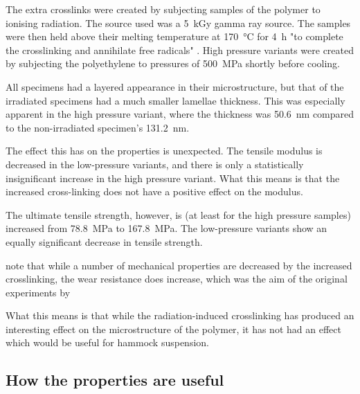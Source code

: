 The extra crosslinks were created by subjecting samples of the polymer to ionising radiation. The source used was a \SI{5}{\kilo\gray} gamma ray source. The samples were then held above their melting temperature at \SI{170}{\celsius} for \SI{4}{\hour} "to complete the crosslinking and annihilate free radicals" . High pressure variants were created by subjecting the polyethylene to pressures of \SI{500}{\mega\pascal} shortly before cooling.

All specimens had a layered appearance in their microstructure, but that of the irradiated specimens had a much smaller lamellae thickness. This was especially apparent in the high pressure variant, where the thickness was \SI{50.6}{\nano\metre} compared to the non-irradiated specimen's \SI{131.2}{\nano\metre}.

The effect this has on the properties is unexpected. The tensile modulus is decreased in the low-pressure variants, and there is only a statistically insignificant increase in the high pressure variant. What this means is that the increased cross-linking does not have a positive effect on the modulus.

The ultimate tensile strength, however, is (at least for the high pressure samples) increased from \SI{78.8}{\mega\pascal} to \SI{167.8}{\mega\pascal}. The low-pressure variants show an equally significant decrease in tensile strength.

\cite{muratoglu_unified_1999} note that while a number of mechanical properties are decreased by the increased crosslinking, the wear resistance does increase, which was the aim of the original experiments by \cite{simis_combined_2006}

What this means is that while the radiation-induced crosslinking has produced an interesting effect on the microstructure of the polymer, it has not had an effect which would be useful for hammock suspension.

\subsection{How the properties are useful}